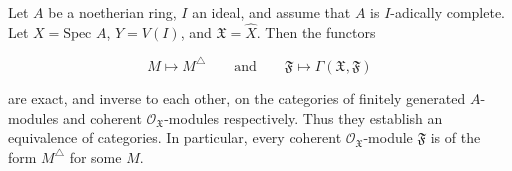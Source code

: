 Let $A$ be a noetherian ring, $I$ an ideal, and assume that $A$ is $I$-adically complete. Let $X = \text{Spec } A$, $Y = V(I)$, and $\mathfrak{X} = \hat{X}$. Then the functors

$$M \mapsto M^\triangle \qquad\text{and}\qquad \mathfrak{F} \mapsto \Gamma(\mathfrak{X}, \mathfrak{F})$$

are exact, and inverse to each other, on the categories of finitely generated $A$-modules and coherent $\mathcal{O}_{\mathfrak{X}}$-modules respectively. Thus they establish an equivalence of categories. In particular, every coherent $\mathcal{O}_{\mathfrak{X}}$-module $\mathfrak{F}$ is of the form $M^\triangle$ for some $M$.
